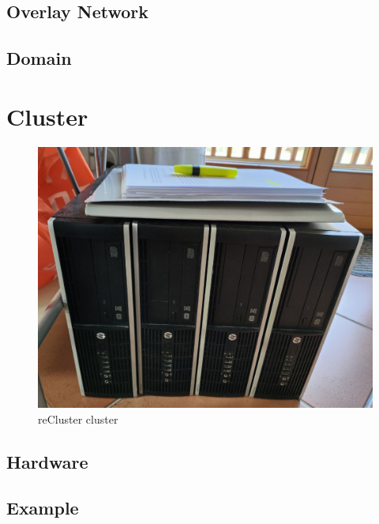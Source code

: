 \subsection{Overlay Network}
\label{subsec:architecture_network_overlay_network}

\subsection{Domain}
\label{subsec:architecture_network_domain}

\section{Cluster}
\label{sec:architecture_cluster}

\begin{figure}
  \centering
  \includegraphics[width=.5\textwidth]{images/recluster/cluster.png}
  \caption{reCluster cluster}
\end{figure}

\subsection{Hardware}
\label{subsec:architecture_cluster_hardware}


\subsection{Example}
\label{subsec:architecture_cluster_example}

